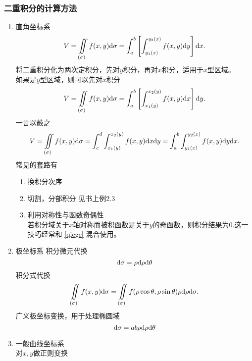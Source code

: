 \subsubsection{二重积分的计算方法}
\begin{enumerate}
	\item 直角坐标系\\
	\begin{equation}
		V= \iint\limits_{(\sigma)} f (x,y) \mathrm{d} \sigma = \int_{a}^{b} \left[\int_{y_1(x)}^{y_2(x)} f (x,y) \mathrm{d} y\right]  \mathrm{d} x.
	\end{equation}
	将二重积分化为两次定积分，先对$y$积分，再对$x$积分，适用于$x$型区域。\\
	如果是$y$型区域，则可以先对$x$积分
	\begin{equation}
		V= \iint\limits_{(\sigma)} f (x,y) \mathrm{d} \sigma = \int_{a}^{b} \left[\int_{x_1(y)}^{x_2(y)} f (x,y) \mathrm{d} x\right]  \mathrm{d} y.
	\end{equation}
	一言以蔽之
	\begin{equation}
		V= \iint\limits_{(\sigma)} f (x,y) \mathrm{d} \sigma 
		= \int_{c}^{d}\int_{x_1(y)}^{x_2(y)} f (x,y) \mathrm{d} x  \mathrm{d} y 
		= \int_{a}^{b}\int_{y_1(x)}^{y_2(x)} f (x,y) \mathrm{d} y  \mathrm{d} x. 
	\end{equation}
	常见的套路有
	\begin{enumerate}
		\item 换积分次序
		\item 切割，分部积分 见书上例2.3 \label{qiege}
		\item 利用对称性与函数奇偶性 \\
		若积分域关于$x$轴对称而被积函数是关于$y$的奇函数，则积分结果为0.这一技巧经常和 \ref{qiege} 混合使用。
	\end{enumerate}
	\item 极坐标系
	积分微元代换
	\begin{equation}
		\mathrm{d} \sigma = \rho \mathrm{d} \rho \mathrm{d} \theta
	\end{equation}
	积分式代换
	\begin{equation}
		\iint \limits_{(\sigma)} f(x,y) \mathrm{d} \sigma = \iint\limits_{(\sigma)} f (\rho \cos \theta ,\rho \sin \theta) \rho \mathrm{d} \rho \mathrm{d} \sigma.
	\end{equation}
	广义极坐标变换，用于处理椭圆域
	\begin{equation}
		\mathrm{d} \sigma = a b \rho \mathrm{d} \rho \mathrm{d} \theta
	\end{equation}
	\item 一般曲线坐标系\\
	对$x,y$做正则变换
	\begin{equation}\label{key}

\end{equation}
\end{enumerate}
